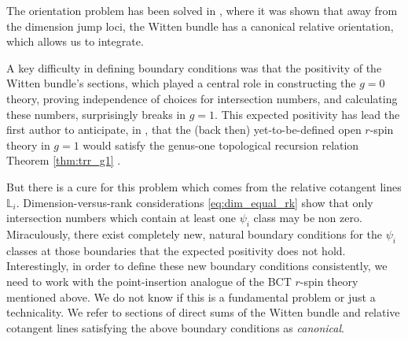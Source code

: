 \documentclass[11pt]{amsart}
\theoremstyle{definition}
\theoremstyle{remark}
\newcommand{\CL}{{\mathbb{L}}}
\newcommand{\<}{\left<}
\renewcommand{\>}{\right>}
\numberwithin{equation}{section}
\begin{document}
The orientation problem has been solved in \cite[\S 3]{TZ1}, where it was shown that away from the dimension %
jump loci, the %
Witten bundle has a canonical relative orientation, which allows us to integrate.

A key difficulty in defining boundary conditions was that the positivity of the Witten bundle's sections, which played a central role in constructing the $g=0$ theory, proving independence of choices for intersection numbers, and calculating these numbers, surprisingly breaks in $g=1.$
This expected positivity has lead %
the first author to %
anticipate, in \cite{BCT3}, that the (back then) yet-to-be-defined open $r$-spin theory in $g=1$ would satisfy the genus-one topological recursion relation %
Theorem \ref{thm:trr_g1} .

But %
there is a cure for %
this problem which %
comes from the relative cotangent lines %
$\CL_i.$ Dimension-versus-rank considerations %
\eqref{eq:dim_equal_rk} show %
that only intersection numbers which contain at least one $\psi_i$ class may be non zero. Miraculously, there exist completely new, natural boundary conditions for %
the $\psi_i$ classes at those boundaries that the expected positivity does not hold. Interestingly, in order to define these new boundary %
conditions consistently, we %
need to work with the point-insertion analogue of the BCT $r$-spin theory mentioned above. We do not know if this is a fundamental problem or just a technicality. We refer to sections of direct sums of the Witten bundle and relative cotangent lines satisfying the above boundary conditions as \emph{canonical}.
\end{document}
